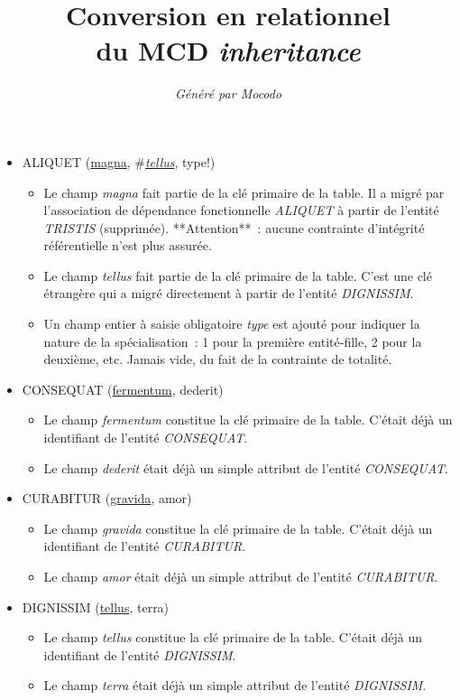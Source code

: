 \documentclass[a4paper]{article}
\title{Conversion en relationnel\\du MCD \emph{inheritance}}
\author{\emph{Généré par Mocodo}}
\newcommand{\relat}[1]{\textsc{#1}}
\newcommand{\attr}[1]{#1}
\newcommand{\prim}[1]{\uline{#1}}
\newcommand{\foreign}[1]{\#\textsl{#1}}
\begin{document}
\maketitle

\begin{itemize}
  \item \relat{ALIQUET} (\prim{magna}, \foreign{\prim{tellus}}, \attr{type!})
  \begin{itemize}
    \item Le champ \emph{magna} fait partie de la clé primaire de la table. Il a migré par l'association de dépendance fonctionnelle \emph{ALIQUET} à partir de l'entité \emph{TRISTIS} (supprimée). **Attention** : aucune contrainte d'intégrité référentielle n'est plus assurée.
    \item Le champ \emph{tellus} fait partie de la clé primaire de la table. C'est une clé étrangère qui a migré directement à partir de l'entité \emph{DIGNISSIM}.
    \item Un champ entier à saisie obligatoire \emph{type} est ajouté pour indiquer la nature de la spécialisation : 1 pour la première entité-fille, 2 pour la deuxième, etc. Jamais vide, du fait de la contrainte de totalité.
  \end{itemize}

  \item \relat{CONSEQUAT} (\prim{fermentum}, \attr{dederit})
  \begin{itemize}
    \item Le champ \emph{fermentum} constitue la clé primaire de la table. C'était déjà un identifiant de l'entité \emph{CONSEQUAT}.
    \item Le champ \emph{dederit} était déjà un simple attribut de l'entité \emph{CONSEQUAT}.
  \end{itemize}

  \item \relat{CURABITUR} (\prim{gravida}, \attr{amor})
  \begin{itemize}
    \item Le champ \emph{gravida} constitue la clé primaire de la table. C'était déjà un identifiant de l'entité \emph{CURABITUR}.
    \item Le champ \emph{amor} était déjà un simple attribut de l'entité \emph{CURABITUR}.
  \end{itemize}

  \item \relat{DIGNISSIM} (\prim{tellus}, \attr{terra})
  \begin{itemize}
    \item Le champ \emph{tellus} constitue la clé primaire de la table. C'était déjà un identifiant de l'entité \emph{DIGNISSIM}.
    \item Le champ \emph{terra} était déjà un simple attribut de l'entité \emph{DIGNISSIM}.
  \end{itemize}


\end{itemize}
\end{document}
